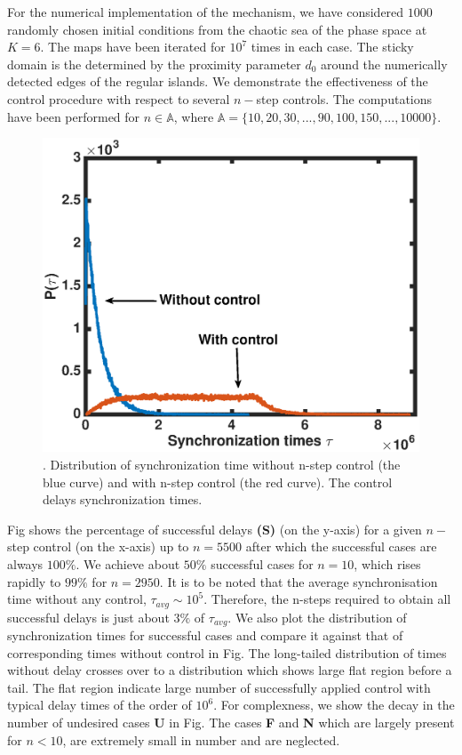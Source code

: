 \documentclass[preprint,showpacs,preprintnumbers,amsmath,amssymb]{revtex4-1}
\begin{document}
For the numerical implementation of the mechanism, we have considered $1000$ randomly chosen initial conditions from the chaotic sea of the phase space at $K = 6$. The maps have been iterated for $10^7$ times in each case.  The sticky domain is the determined by the proximity parameter $d_0$ around the numerically detected edges of the regular islands. We demonstrate the effectiveness of the control procedure  with respect to several $n-$step controls. The computations have been performed for $n \in \mathbb{A}$, where $\mathbb{A} = \{10, 20,30,...,90, 100, 150, ... ,10 000\}$.  

\begin{figure}[t]
\includegraphics[scale=0.6]{Sync_time_dist.eps}
\caption{\label{fig:Sync_time_dist} \footnotesize. Distribution of 
synchronization time without n-step control (the blue curve) and with n-step 
control (the red curve). The control delays synchronization times. }
\end{figure}


Fig  shows the percentage of successful delays \textbf{(S)} (on the y-axis) for a given $n-$step control (on the x-axis) up to $n = 5500$ after which the successful cases are always $100\%$.  We achieve about $50\%$ successful cases for $n = 10$, which rises rapidly to $99\%$ for $n = 2950$. It is to be noted that the average synchronisation time without any control, $\tau_{avg} \sim 10^5$. Therefore, the n-steps required to obtain all successful delays is just about $3\%$ of $\tau_{avg}$. We also plot the distribution of synchronization times for successful cases and compare it against that of corresponding times without control in Fig. The long-tailed distribution of times without delay crosses over to a distribution which shows large flat region before a tail. The flat region indicate large number of successfully applied control with typical delay times of the order of $10^6$. For complexness, we show the decay in the number of undesired cases \textbf{U} in Fig.  The cases \textbf{F} and \textbf{N} which are largely present for $n<10$, are extremely small in number and are neglected. 
\end{document}
